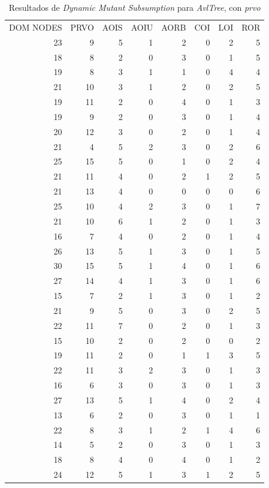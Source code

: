 \begin{table}[]
	\caption{Resultados de \emph{Dynamic Mutant Subsumption} para \emph{AvlTree}, con \emph{prvo}}
	\label{tables.results.subsumption.avltree.prvo}
	\centering
	\scriptsize
	\def\arraystretch{0.95}
	\setlength\tabcolsep{0.5mm}
	\begin{tabular}{rrrrrrrr}
		DOM NODES & PRVO & AOIS & AOIU & AORB & COI & LOI & ROR \\
		23 & 9 & 5 & 1 & 2 & 0 & 2 & 5 \\
		18 & 8 & 2 & 0 & 3 & 0 & 1 & 5 \\
		19 & 8 & 3 & 1 & 1 & 0 & 4 & 4 \\
		21 & 10 & 3 & 1 & 2 & 0 & 2 & 5 \\
		19 & 11 & 2 & 0 & 4 & 0 & 1 & 3 \\
		19 & 9 & 2 & 0 & 3 & 0 & 1 & 4 \\
		20 & 12 & 3 & 0 & 2 & 0 & 1 & 4 \\
		21 & 4 & 5 & 2 & 3 & 0 & 2 & 6 \\
		25 & 15 & 5 & 0 & 1 & 0 & 2 & 4 \\
		21 & 11 & 4 & 0 & 2 & 1 & 2 & 5 \\
		21 & 13 & 4 & 0 & 0 & 0 & 0 & 6 \\
		25 & 10 & 4 & 2 & 3 & 0 & 1 & 7 \\
		21 & 10 & 6 & 1 & 2 & 0 & 1 & 3 \\
		16 & 7 & 4 & 0 & 2 & 0 & 1 & 4 \\
		26 & 13 & 5 & 1 & 3 & 0 & 1 & 5 \\
		30 & 15 & 5 & 1 & 4 & 0 & 1 & 6 \\
		27 & 14 & 4 & 1 & 3 & 0 & 1 & 6 \\
		15 & 7 & 2 & 1 & 3 & 0 & 1 & 2 \\
		21 & 9 & 5 & 0 & 3 & 0 & 2 & 5 \\
		22 & 11 & 7 & 0 & 2 & 0 & 1 & 3 \\
		15 & 10 & 2 & 0 & 2 & 0 & 0 & 2 \\
		19 & 11 & 2 & 0 & 1 & 1 & 3 & 5 \\
		22 & 11 & 3 & 2 & 3 & 0 & 1 & 3 \\
		16 & 6 & 3 & 0 & 3 & 0 & 1 & 3 \\
		27 & 13 & 5 & 1 & 4 & 0 & 2 & 4 \\
		13 & 6 & 2 & 0 & 3 & 0 & 1 & 1 \\
		22 & 8 & 3 & 1 & 2 & 1 & 4 & 6 \\
		14 & 5 & 2 & 0 & 3 & 0 & 1 & 3 \\
		18 & 8 & 4 & 0 & 4 & 0 & 1 & 2 \\
		24 & 12 & 5 & 1 & 3 & 1 & 2 & 5
	\end{tabular}
\end{table}

